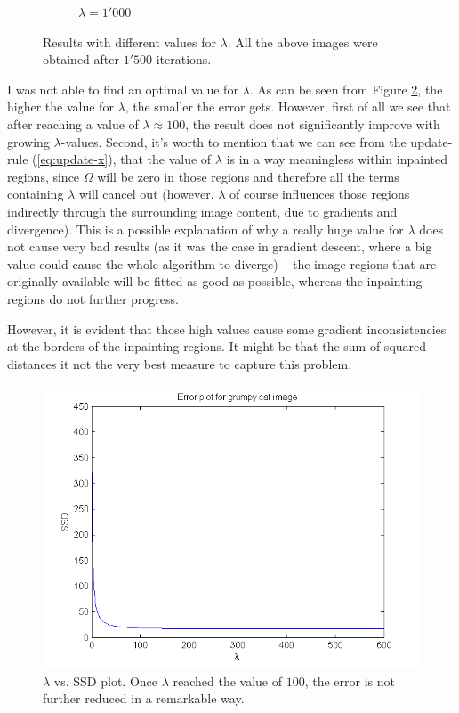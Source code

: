 \documentclass{paper}
\begin{document}
\begin{figure}[ht]
\begin{subfigure}[ht]{0.3\textwidth}
	\caption*{$\lambda = 1'000$}
\end{subfigure}
\caption{Results with different values for $\lambda$. All the above images were obtained after $1'500$ iterations.}
\label{fig:results-lambda}
\end{figure}

I was not able to find an optimal value for $\lambda$. As can be seen from Figure \ref{fig:plot-ssd}, the higher the value for $\lambda$, the smaller the error gets. However, first of all we see that after reaching a value of $\lambda \approx 100$, the result does not significantly improve with growing $\lambda$-values. Second, it's worth to mention that we can see from the update-rule (\ref{eq:update-x}), that the value of $\lambda$ is in a way meaningless within inpainted regions, since $\Omega$ will be zero in those regions and therefore all the terms containing $\lambda$ will cancel out (however, $\lambda$ of course influences those regions indirectly through the surrounding image content, due to gradients and divergence). This is a possible explanation of why a really huge value for $\lambda$ does not cause very bad results (as it was the case in gradient descent, where a big value could cause the whole algorithm to diverge) -- the image regions that are originally available will be fitted as good as possible, whereas the inpainting regions do not further progress.

However, it is evident that those high values cause some gradient inconsistencies at the borders of the inpainting regions. It might be that the sum of squared distances it not the very best measure to capture this problem.

\begin{figure}[ht]
 \centering
 \includegraphics[width=\textwidth]{ssd}
  \caption{$\lambda$ vs. SSD plot. Once $\lambda$ reached the value of $100$, the error is not further reduced in a remarkable way. }
 \label{fig:plot-ssd}
\end{figure}
\end{document}
